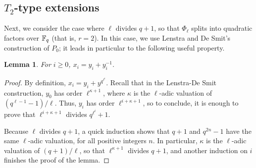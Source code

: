 \documentclass{sig-alternate}
\newtheorem{lemma}[definition]{Lemma}
\begin{document}

\subsection{$T_2$-type extensions}

Next, we consider the case where $\ell$ divides $q+1$, so that
$\Phi_\ell$ splits into quadratic factors over $\mathbb{F}_q$ (that is,
$r=2$). In this case, we use Lenstra and De Smit's construction of
$P_0$; it leads in particular to the following useful property.

\begin{lemma}
  For $i \ge 0$, $x_i = y_i +y_i^{-1}$.
\end{lemma}
\begin{proof}
  By definition, $x_i=y_i+y^{q^{\ell^i}}$. Recall that in the
  Lenstra-De Smit construction, $y_0$ has order $\ell^{\kappa+1}$,
  where $\kappa$ is the $\ell$-adic valuation of
  $(q^{\ell-1}-1)/\ell$. Thus, $y_i$ has order $\ell^{i+\kappa+1}$, so
  to conclude, it is enough to prove that $\ell^{i+\kappa+1}$ divides
  $q^{\ell^i}+1$.

  Because $\ell$ divides $q+1$, a quick induction shows that $q+1$ and
  $q^{2n}-1$ have the same $\ell$-adic valuation, for all positive
  integers $n$. In particular, $\kappa$ is the $\ell$-adic valuation
  of $(q+1)/\ell$, so that $\ell^{\kappa+1}$ divides $q+1$, and another
  induction on $i$ finishes the proof of the lemma.
\end{proof}
\end{document}
